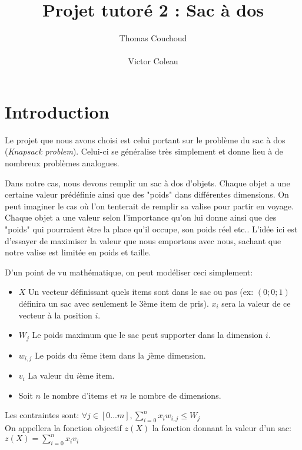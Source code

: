 \documentclass{EPUProjetPeiP}
\title[Projet sac à dos]{Projet tutoré 2 : Sac à dos}
\author{Thomas Couchoud\\
\noindent[\url{thomas.couchoud@etu.univ-tours.fr}]\\
Victor Coleau\\
\noindent[\url{victor.coleau@etu.univ-tours.fr}]}
\begin{document}
\maketitle

\setcounter{page}{0}
{
\setlength{\parskip}{0em}

\tableofcontents


}


\start

\chapter*{Introduction}
Le projet que nous avons choisi est celui portant sur le problème du sac à dos (\textit{Knapsack problem}). Celui-ci se généralise très simplement et donne lieu à de nombreux problèmes analogues.

Dans notre cas, nous devons remplir un sac à dos d'objets. Chaque objet a une certaine valeur prédéfinie ainsi que des "poids" dans différentes dimensions. On peut imaginer le cas où l'on tenterait de remplir sa valise pour partir en voyage. Chaque objet a une valeur selon l'importance qu'on lui donne ainsi que des "poids" qui pourraient être la place qu'il occupe, son poids réel etc.. L'idée ici est d'essayer de maximiser la valeur que nous emportons avec nous, sachant que notre valise est limitée en poids et taille.

D'un point de vu mathématique, on peut modéliser ceci simplement:
\begin{itemize}
	\item $X$ Un vecteur définissant quels items sont dans le sac ou pas (ex: $(0; 0; 1)$ définira un sac avec seulement le 3ème item de pris). $x_i$ sera la valeur de ce vecteur à la position $i$.
	\item $W_j$ Le poids maximum que le sac peut supporter dans la dimension $i$.
	\item $w_{i,j}$ Le poids du $i$ème item dans la $j$ème dimension.
	\item $v_i$ La valeur du $i$ème item.
	\item Soit $n$ le nombre d'items et $m$ le nombre de dimensions. \\
\end{itemize}
Les contraintes sont: $\forall j\in [0...m], \sum_{i=0}^nx_iw_{i,j}\leq W_j$\\
On appellera la fonction objectif $z(X)$ la fonction donnant la valeur d'un sac: $z(X)=\sum_{i=0}^nx_iv_i$
\end{document}
